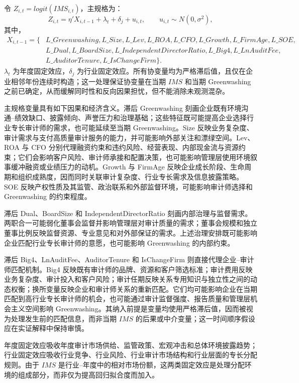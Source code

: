 \documentclass[11pt]{article}
\begin{document}
令 $Z_{i,t}=logit(IMS_{i,t})$，主规格为：
\[
Z_{i,t}=\eta'X_{i,t-1}+\lambda_t+\delta_j+u_{i,t},
\qquad u_{i,t}\sim N(0,\sigma^2),
\]
其中，
\[
\begin{split}
X_{i,t-1}=\{&L\_Greenwashing, L\_Size, L\_Lev, L\_ROA, L\_CFO, L\_Growth, L\_FirmAge, L\_SOE,\\
&L\_Dual, L\_BoardSize, L\_IndependentDirectorRatio, L\_Big4, L\_LnAuditFee,\\
&L\_AuditorTenure, L\_IsChangeFirm\}.
\end{split}
\]
$\lambda_t$ 为年度固定效应，$\delta_j$ 为行业固定效应。所有协变量均为严格滞后值，且仅在企业相邻年份连续时构造；这一处理保证协变量在当期 $IMS$ 和当期 Greenwashing 之前已确定，从而缓解同时性和反向因果担忧，但不能消除未观测混杂。

主规格变量具有如下因果和经济含义。滞后 Greenwashing 刻画企业既有环境沟通--绩效缺口、披露倾向、声誉压力和治理基础；这些特征既可能提高企业选择行业专长审计师的需求，也可能延续至当期 Greenwashing。Size 反映业务复杂度、审计需求与支付高质量审计服务的能力，并可能影响外部关注和漂绿空间。Lev、ROA 与 CFO 分别代理融资约束和违约风险、经营表现、内部现金流与资源约束；它们会影响客户风险、审计师承接和配置决策，也可能影响管理层使用环境叙事缓冲融资或业绩压力的动机。Growth 与 FirmAge 反映企业成长阶段、生命周期和组织成熟度，因而同时关联审计复杂度、行业专长需求及信息披露策略。SOE 反映产权性质及其监管、政治联系和外部监督环境，可能影响审计师选择和 Greenwashing 的约束程度。

滞后 Dual、BoardSize 和 IndependentDirectorRatio 刻画内部治理与监督需求。两职合一可能弱化董事会监督并影响管理层对审计质量的需求；董事会规模和独立董事比例反映监督资源、专业意见和对外部保证的需求。上述治理安排既可能影响企业匹配行业专长审计师的意愿，也可能影响 Greenwashing 的内部约束。

滞后 Big4、LnAuditFee、AuditorTenure 和 IsChangeFirm 则直接代理企业--审计师匹配机制。Big4 反映既有审计师的品牌、资源和客户筛选标准；审计费用反映业务复杂度、审计投入和客户风险；审计任期反映关系专用知识与独立性之间的动态权衡；换所变量反映企业和审计师关系的重新匹配。它们均可能影响企业在当期匹配到高行业专长审计师的机会，也可能通过审计监督强度、报告质量和管理层机会主义空间影响 Greenwashing。其纳入前提是变量均使用严格滞后值，因而被视为处理发生前的匹配信息，而非当期 $IMS$ 的后果或中介变量；这一时间顺序假设应在实证解释中保持审慎。

年度固定效应吸收年度审计市场供给、监管政策、宏观冲击和总体环境披露趋势；行业固定效应吸收行业竞争、行业风险、行业审计市场结构和行业层面的专长分配规则。由于 $IMS$ 是行业--年度中的相对市场份额，这两类固定效应是处理分配环境的组成部分，而非仅为提高回归拟合度而加入。
\end{document}

